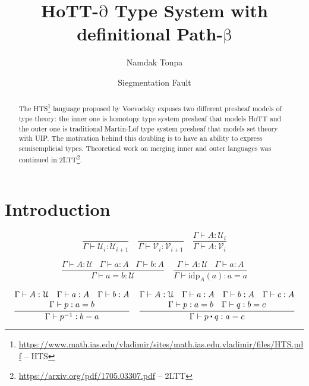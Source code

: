 \documentclass[a4paper,UKenglish,cleveref, autoref, thm-restate]{lipics-v2021}
\title{HoTT-\ensuremath{\mathrm{\partial}} Type System with definitional Path-\ensuremath{\mathrm{\beta}}}
\author{Namdak Tonpa}{Groupoid Infinity}{maxim@synrc.com}{https://orcid.org/0000-0001-7127-8796}{}
\author{Siegmentation Fault}{Groupoid Infinity}{siegmentationfault@yandex.ru}{}{}
\newcommand{\UU}{\ensuremath{\mathcal{U}}}
\newcommand{\VV}{\ensuremath{\mathcal{V}}}
\newcommand{\ct}{%
  \mathchoice{\mathbin{\raisebox{0.5ex}{$\displaystyle\centerdot$}}}%
             {\mathbin{\raisebox{0.5ex}{$\centerdot$}}}%
             {\mathbin{\raisebox{0.25ex}{$\scriptstyle\,\centerdot\,$}}}%
             {\mathbin{\raisebox{0.1ex}{$\scriptscriptstyle\,\centerdot\,$}}}
}
\begin{document}
\maketitle

\begin{abstract}
The HTS\footnote{\url{https://www.math.ias.edu/vladimir/sites/math.ias.edu.vladimir/files/HTS.pdf} -- HTS}
language proposed by Voevodsky exposes two different presheaf models of type theory:
the inner one is homotopy type system presheaf that models HoTT and the outer one is traditional Martin-Löf
type system presheaf that models set theory with UIP. The motivation behind this doubling is to
have an ability to express semisemplicial types. Theoretical work on merging inner
and outer languages was continued in 2LTT\footnote{\url{https://arxiv.org/pdf/1705.03307.pdf} -- 2LTT}.
\end{abstract}

\section{Introduction}
\label{sec:typesetting-summary}

\begin{equation*}
    \frac{}{\Gamma \vdash \UU_i : \UU_{i + 1}}
    \quad
    \frac{}{\Gamma \vdash \VV_i : \VV_{i + 1}}
    \quad
    \frac{\Gamma \vdash A : \UU_i}{\Gamma \vdash A : \VV_i}
\end{equation*}

\begin{equation*}
    \frac{\Gamma \vdash A : \UU \hspace{10pt} \Gamma \vdash a : A \hspace{10pt} \Gamma \vdash b : A}
         {\Gamma \vdash a = b : \UU}
    \quad
    \frac{\Gamma \vdash A : \UU \hspace{10pt} \Gamma \vdash a : A}
         {\Gamma \vdash \mathrm{idp}_A(a) : a = a}
\end{equation*}

\begin{equation*}
    \frac{\begin{matrix}
            \Gamma \vdash A : \UU \hspace{10pt} \Gamma \vdash a : A \hspace{10pt} \Gamma \vdash b : A \\
            \Gamma \vdash p : a = b
          \end{matrix}}
         {\Gamma \vdash p^{-1} : b = a}
    \quad
    \frac{\begin{matrix}
            \Gamma \vdash A : \UU \hspace{10pt} \Gamma \vdash a : A \hspace{10pt} \Gamma \vdash b : A \hspace{10pt} \Gamma \vdash c : A \\
            \Gamma \vdash p : a = b \hspace{10pt} \Gamma \vdash q : b = c
          \end{matrix}}
         {\Gamma \vdash p \ct q : a = c}
\end{equation*}
\end{document}
